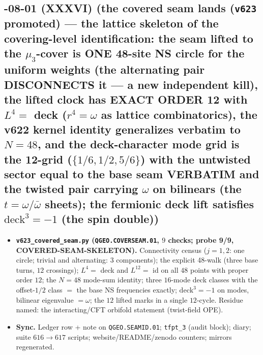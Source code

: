 \subsection*{-08-01 (XXXVI) (the covered seam lands (\texttt{v623} promoted) --- the lattice skeleton of the covering-level identification: the seam lifted to the $\mu_3$-cover is ONE 48-site NS circle for the uniform weights (the alternating pair DISCONNECTS it --- a new independent kill), the lifted clock has EXACT ORDER 12 with $L^4=$ deck ($r^4=\omega$ as lattice combinatorics), the v622 kernel identity generalizes verbatim to $N=48$, and the deck-character mode grid is the 12-grid ($\{1/6,1/2,5/6\}$) with the untwisted sector equal to the base seam VERBATIM and the twisted pair carrying $\omega$ on bilinears (the $t=\omega/\bar\omega$ sheets); the fermionic deck lift satisfies $\mathrm{deck}^3=-1$ (the spin double))}
\begin{itemize}[leftmargin=1.5em]
\item \textbf{\texttt{v623\_covered\_seam.py} (\texttt{QGEO.COVERSEAM.01}, $9$ checks; probe
9/9, COVERED-SEAM-SKELETON).} Connectivity census ($j=1,2$: one circle; trivial and
alternating: $3$ components); the explicit 48-walk (three base turns, $12$ crossings);
$L^4=$ deck and $L^{12}=$ id on all $48$ points with proper order $12$; the $N=48$
mode-sum identity; three $16$-mode deck classes with the offset-$1/2$ class $=$ the base
NS frequencies exactly; $\mathrm{deck}^3=-1$ on modes, bilinear eigenvalue $=\omega$;
the $12$ lifted marks in a single $12$-cycle.  Residue named: the interacting/CFT
orbifold statement (twist-field OPE).
\item \textbf{Sync.} Ledger row + note on \texttt{QGEO.SEAMID.01}; \texttt{tfpt\_3}
(audit block); diary; suite $616\to617$ scripts; website/README/zenodo counters;
mirrors regenerated.
\end{itemize}

